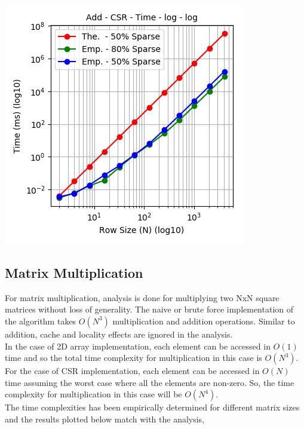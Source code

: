 \documentclass[11pt,a4paper,oneside]{article}
\begin{document}
    \begin{center}
    	\includegraphics[scale=0.6]{4.png}		
    \end{center}
    
    \subsection{Matrix Multiplication}
    For matrix multiplication, analysis is done for multiplying two NxN square matrices without loss of generality. The naive or brute force implementation of the algorithm takes $O(N^3)$ multiplication and addition operations. Similar to addition, cache and locality effects are ignored in the analysis. \\
    \newline
    In the case of 2D array implementation, each element can be accessed in $O(1)$ time and so the total time complexity for multiplication in this case is $O(N^3)$. \\
    \newline
    For the case of CSR implementation, each element can be accessed in $O(N)$ time assuming the worst case where all the elements are non-zero. So, the time complexity for multiplication in this case will be $O(N^4)$. \\   
    \newline    
    The time complexities has been empirically determined for different matrix sizes and the results plotted below match with the analysis,
    
\end{document}
